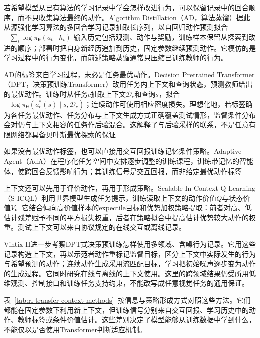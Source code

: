 若希望模型从已有算法的学习记录中学会怎样改进行为，可以保留记录中的回合顺序，而不只收集算法最终的动作。Algorithm Distillation（AD，算法蒸馏）据此从源强化学习算法的多回合学习记录抽取长序列，以自回归动作预测拟合
$-\sum_t\log\pi_{\bm\theta}(a_t\mid h_t)$
输入历史包括观测、动作与奖励，训练样本保留从探索到改进的顺序；部署时把自身新经历追加到历史，固定参数继续预测动作。它模仿的是学习过程中的行为变化，而前述策略蒸馏通常只压缩已训练教师的行为。

AD的标签来自学习过程，未必是任务最优动作。Decision Pretrained Transformer（DPT，决策预训练Transformer）改用任务内上下文和查询状态，预测教师给出的最优动作。训练时从任务$c$抽取上下文$\mathcal D_c$和查询$s$，拟合
$-\log\pi_{\bm\theta}(a_c^*(s)\mid s,\mathcal D_c)$；连续动作可使用相应密度损失。理想化地，若标签确为各任务最优动作、任务分布与上下文生成方式正确覆盖测试情形，监督条件分布会对仍与上下文相容的任务作后验混合。这解释了与后验采样的联系，不是任意有限网络都具备贝叶斯最优探索的保证

如果没有最优动作标签，也可以直接用交互回报训练记忆条件策略。Adaptive Agent（AdA）在程序化任务空间中安排逐步调整的训练课程，训练带记忆的智能体，使跨回合反馈影响行为；其训练信号是交互回报，而非给定最优动作标签

上下文还可以先用于评价动作，再用于形成策略。Scalable In-Context Q-Learning（S-ICQL）利用世界模型生成任务提示，训练读取上下文的动作价值$Q$与状态价值$V$。它结合偏向高价值样本的expectile目标和优势加权策略提取：前者对高、低估计残差赋予不同的平方损失权重，后者在策略拟合中提高估计优势较大动作的权重。测试上下文可以来自协议规定的在线交互或离线记录。

Vintix II进一步考察DPT式决策预训练怎样使用多领域、含噪行为记录。它用这些记录构造上下文，再以示范者动作重标记监督目标，区分上下文中实际发生的行为与希望预测的动作；连续动作生成采用流匹配目标，学习把初始噪声逐步变为动作的生成过程。它同时研究在线与离线的上下文使用。这里的跨领域结果仍受所用低维观测、控制接口和训练任务支持约束，不能改写成任意视觉任务的通用保证。

表~\ref{tab:rl-transfer-context-methods}~按信息与策略形成方式对照这些方法。它们都能在固定参数下利用新上下文，但训练信号分别来自交互回报、学习历史中的动作、教师标签或条件价值估计。这些差别决定了模型能够从训练数据中学到什么，不能仅以是否使用Transformer判断适应机制。

